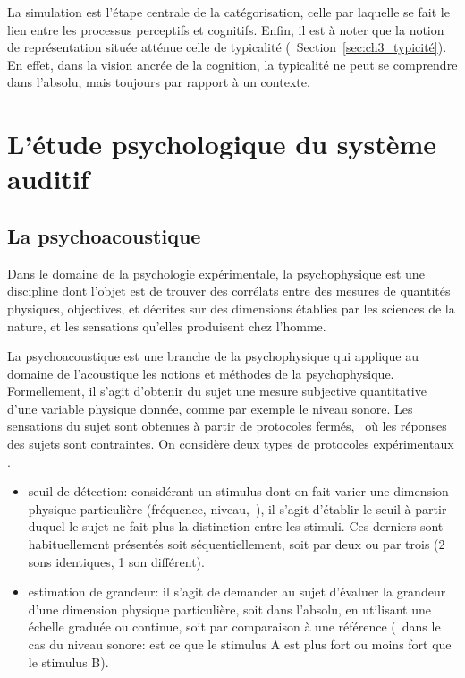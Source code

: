 La simulation est l'étape centrale de la catégorisation, celle par laquelle se fait le lien entre les processus perceptifs et cognitifs. Enfin, il est à noter que la notion de représentation située atténue celle de typicalité (\cf~Section~\ref{sec:ch3_typicité}). En effet, dans la vision ancrée de la cognition, la typicalité ne peut se comprendre dans l'absolu, mais toujours par rapport à un contexte.

\section{L'étude psychologique du système auditif}

\subsection{La psychoacoustique}

Dans le domaine de la psychologie expérimentale, la psychophysique est une discipline dont l'objet est de trouver des corrélats entre des mesures de quantités physiques, objectives, et décrites sur des dimensions établies par les sciences de la nature, et les sensations qu'elles produisent chez l'homme.

La psychoacoustique est une branche de la psychophysique qui applique au domaine de l'acoustique les notions et méthodes de la psychophysique. Formellement, il s'agit d'obtenir du sujet une mesure subjective quantitative d'une variable physique donnée, comme par exemple le niveau sonore. Les sensations du sujet sont obtenues à partir de protocoles fermés, \ie~où les réponses des sujets sont contraintes. On considère deux types de protocoles expérimentaux \citep[p. 29-30]{guastavino_etude_2003}.

\begin{itemize}
\item seuil de détection: considérant un stimulus dont on fait varier une dimension physique particulière (fréquence, niveau,~\etc), il s'agit d'établir le seuil à partir duquel le sujet ne fait plus la distinction entre les stimuli. Ces derniers sont habituellement présentés soit séquentiellement, soit par deux ou par trois (2 sons identiques, 1 son différent).
\item estimation de grandeur: il s'agit de demander au sujet d'évaluer la grandeur d'une dimension physique particulière, soit dans l'absolu, en utilisant une échelle graduée ou continue, soit par comparaison à une référence (\eg~dans le cas du niveau sonore: est ce que le stimulus A est plus fort ou moins fort que le stimulus B).
\end{itemize}

